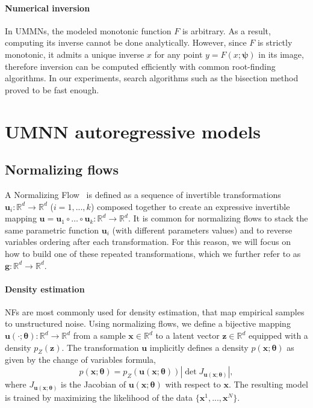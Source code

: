 \paragraph{Numerical inversion}
In UMMNs, the modeled monotonic function $F$ is arbitrary.
As a result, computing its inverse cannot be done analytically.
However, since $F$ is strictly monotonic, it admits a unique inverse $x$ for any point $y=F(x;\mathbf{\psi})$ in its image, therefore inversion can be computed efficiently with common root-finding algorithms.
In our experiments, search algorithms such as the bisection method proved to be fast enough.



\section{UMNN autoregressive models}

\subsection{Normalizing flows}

A Normalizing Flow~\citep[NF, ][]{NF} is defined as a sequence of invertible transformations $\mathbf{u}_i : \mathbb{R}^d \to \mathbb{R}^d$  ($i=1, ..., k$) composed together to create an expressive invertible mapping $\mathbf{u} = \mathbf{u}_1 \circ \dots \circ \mathbf{u}_k : \mathbb{R}^d \to \mathbb{R}^d$.
It is common for normalizing flows to stack the same parametric function $\mathbf{u}_i$ (with different parameters values) and to reverse variables ordering after each transformation. For this reason, we will focus on how to build one of these repeated transformations, which we further refer to as $\mathbf{g}: \mathbb{R}^d\rightarrow \mathbb{R}^d$.

\paragraph{Density estimation}
NFs are most commonly used for density estimation, that map empirical samples to unstructured noise.
Using normalizing flows, we define  a bijective mapping $\mathbf{u}(\cdot ;\mathbf{\theta}): \mathbb{R}^d \rightarrow \mathbb{R}^d$ from a sample $\mathbf{x} \in \mathbb{R}^d$ to a latent vector $\mathbf{z} \in \mathbb{R}^d$ equipped with a density $p_Z(\mathbf{z})$.
The transformation $\mathbf{u}$ implicitly defines a density $p(\mathbf{x}; \mathbf{\theta})$ as given by the change of variables formula,
\begin{equation}
    p(\mathbf{x}; \mathbf{\theta}) = p_Z(\mathbf{u}(\mathbf{x};\mathbf{\theta})) \left| \det  J_{\mathbf{u}(\mathbf{x};\mathbf{\theta})} \right|, \label{eq:NF_DE}
\end{equation}
where $J_{\mathbf{u}(\mathbf{x};\mathbf{\theta})}$ is the Jacobian of $\mathbf{u}(\mathbf{x};\mathbf{\theta})$ with respect to $\mathbf x$.
The resulting model is trained by maximizing the likelihood of the data $\{\mathbf{x}^1, ..., \mathbf{x}^N\}$.

